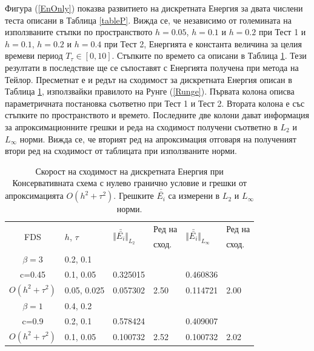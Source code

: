 \documentclass[a4paper]{article}
\newcommand{\rf}[1]{(\ref{#1})}
\theoremstyle{remark}
\begin{document}
Фигура \rf{EnOnly} показва развитието на дискретната Енергия за двата числени теста описани в Таблица \ref{tableP}. Вижда се, че независимо от големината на използваните стъпки по пространството $h = 0.05$, $h = 0.1$ и $h = 0.2$ при Тест 1 и $h = 0.1$, $h = 0.2$ и $h = 0.4$ при Тест 2, Енергията е константа величина за целия времеви период $T_{\tau} \in [0, 10]$. Стъпките по времето са описани в Таблица \ref{tableD}. Тези резултати в последствие ще се съпоставят с Енергията получена при метода на Тейлор. Пресметнат е и редът на сходимост за дискретната Енергия описан в Таблица \ref{tableD}, използвайки правилото на Рунге \rf{Runge}. Първата колона описва параметричната постановка съответно при Тест 1 и Тест 2. Втората колона е със стъпките по пространството и времето. Последните две колони дават информация за апроксимационните грешки и реда на сходимост получени съответно в $L_2$ и $L_\infty$ норми. Вижда се, че вторият ред на апроксимация отговаря на полученият втори ред на сходимост от таблицата при използваните норми.
\begin{table}[ht]
\centering
\small
		\begin{tabular}{||c|l|ll|ll||}
			\hline
			\hline
      \multirow{2  }{*}{FDS}        & \multirow{2  }{*}{$h$, $\tau$}  &  	\multirow{2  }{*}{ $\Vert \bar{\bar{ E_i}} \Vert_{L_2}$ }	&Ред на	& \multirow{2  }{*}{ $\Vert \bar{\bar{ E_i}} \Vert_{L_\infty}$ } 		&Ред на   \\
	                                        &                                                & 							 					&  сход. 	& 								       					& сход. \\
   			\hline 
					\hline 
  $\beta=3$                &0.2, 0.1         &                    &                &                  &                   \\
   c=0.45                     &0.1, 0.05         & 0.325015   &                & 0.460836  &                   \\
     $O(h^2 + \tau^ 2)$ &0.05, 0.025  & 0.057302   & 2.50       & 0.114721  & 2.00   \\
	   \hline
			\hline 
       $\beta=1$           & 0.4, 0.2       &                   &           &                 &   \\
                  c=0.9       & 0.2, 0.1        & 0.578424   &          &0.409007  &   \\
  $O(h^2+ \tau^2)$  & 0.1, 0.05       & 0.100732   & 2.52  &0.100732  & 2.02  \\
	   \hline
			\hline 
		\end{tabular}
		\caption{Скорост на сходимост на дискретната Енергия при Консервативната схема с нулево гранично условие и грешки от апроксимацията $O(h^{2} + \tau^2 )$. Грешките $\bar{\bar{ E_i}}$ са измерени в $L_2$ и $L_\infty$ норми.}
\label{tableD}
\end{table}
\end{document}
